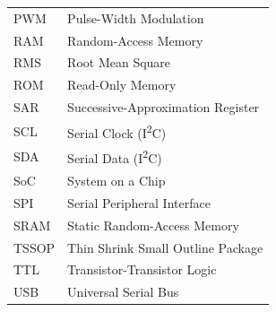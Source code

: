 \begin{longtable}{L{3.2cm}L{\dimexpr\textwidth-4.4cm\relax}}
PWM    & Pulse-Width Modulation \\
RAM    & Random-Access Memory \\
RMS    & Root Mean Square \\
ROM    & Read-Only Memory \\
SAR    & Successive-Approximation Register \\
SCL    & Serial Clock (I\textsuperscript{2}C) \\
SDA    & Serial Data (I\textsuperscript{2}C) \\
SoC    & System on a Chip \\
SPI    & Serial Peripheral Interface \\
SRAM   & Static Random-Access Memory \\
TSSOP  & Thin Shrink Small Outline Package \\
TTL    & Transistor-Transistor Logic \\
USB    & Universal Serial Bus \\
\bottomrule
\end{longtable}
